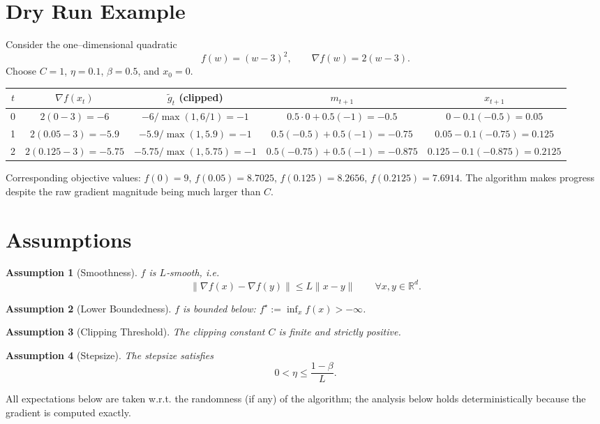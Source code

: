 \documentclass{article}
\newtheorem{assumption}{Assumption}
\newcommand{\R}{\mathbb{R}}
\begin{document}
\section*{Dry Run Example}
Consider the one–dimensional quadratic
\[
f(w)=(w-3)^{2},\qquad \nabla f(w)=2(w-3).
\]
Choose $C=1$, $\eta=0.1$, $\beta=0.5$, and $x_{0}=0$.
\begin{center}
\begin{tabular}{c|c|c|c|c}
$t$ & $\nabla f(x_t)$ & $\tilde g_t$ (clipped) & $m_{t+1}$ & $x_{t+1}$ \\ \hline
0 & $2(0-3)=-6$ & $-6 / \max(1,6/1) = -1$ & $0.5\cdot0+0.5(-1)=-0.5$ & $0-0.1(-0.5)=0.05$ \\[4pt]
1 & $2(0.05-3)=-5.9$ & $-5.9/\max(1,5.9)= -1$ & $0.5(-0.5)+0.5(-1)=-0.75$ & $0.05-0.1(-0.75)=0.125$ \\[4pt]
2 & $2(0.125-3)=-5.75$ & $-5.75/\max(1,5.75)= -1$ & $0.5(-0.75)+0.5(-1)=-0.875$ & $0.125-0.1(-0.875)=0.2125$
\end{tabular}
\end{center}
Corresponding objective values:
$f(0)=9$, $f(0.05)=8.7025$, $f(0.125)=8.2656$, $f(0.2125)=7.6914$.
The algorithm makes progress despite the raw gradient magnitude being much larger than $C$.

\newpage
\section*{Assumptions}
\begin{assumption}[Smoothness]\label{as:smooth}
$f$ is $L$‑smooth, i.e.
\[
\|\nabla f(x)-\nabla f(y)\|\le L\|x-y\|\qquad\forall x,y\in\R^{d}.
\]
\end{assumption}

\begin{assumption}[Lower Boundedness]\label{as:lb}
$f$ is bounded below: $f^{\star}:=\inf_{x}f(x)>-\infty$.
\end{assumption}

\begin{assumption}[Clipping Threshold]\label{as:clip}
The clipping constant $C$ is finite and strictly positive.
\end{assumption}

\begin{assumption}[Stepsize]\label{as:stepsize}
The stepsize satisfies
\[
0<\eta\le\frac{1-\beta}{L}.
\]
\end{assumption}

All expectations below are taken w.r.t. the randomness (if any) of the algorithm; the analysis below holds deterministically because the gradient is computed exactly.
\end{document}
